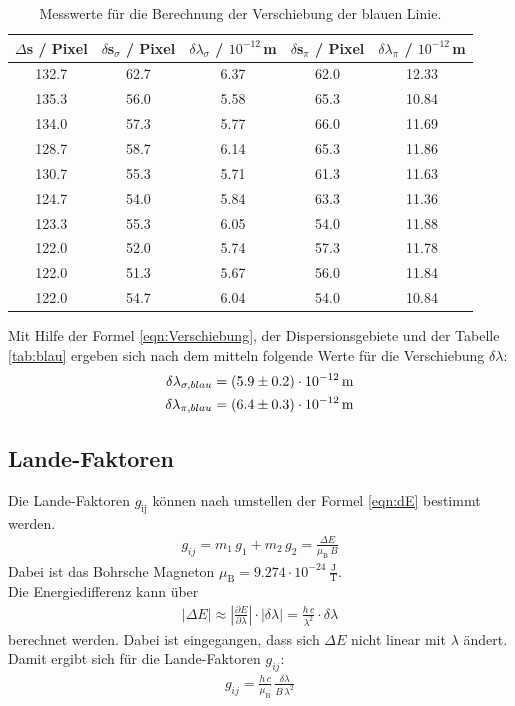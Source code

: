 \begin{table}[H]
  \centering
  \caption{Messwerte für die Berechnung der Verschiebung der blauen Linie.}
  \label{tab:blau}
  \begin{tabular}{c | c c | c c}
    $\Delta$s / Pixel & $\delta$s$_{\sigma}$ / Pixel & $\delta \lambda_{\sigma}$ / $10^{-12}$\,m & $\delta$s$_{\pi}$ / Pixel & $\delta \lambda_{\pi}$ / $10^{-12}$\,m \\
    \hline
    132.7 & 62.7 & 6.37 & 62.0 & 12.33 \\
    135.3 & 56.0 & 5.58 & 65.3 & 10.84 \\
    134.0 & 57.3 & 5.77 & 66.0 & 11.69 \\
    128.7 & 58.7 & 6.14 & 65.3 & 11.86 \\
    130.7 & 55.3 & 5.71 & 61.3 & 11.63 \\
    124.7 & 54.0 & 5.84 & 63.3 & 11.36 \\
    123.3 & 55.3 & 6.05 & 54.0 & 11.88 \\
    122.0 & 52.0 & 5.74 & 57.3 & 11.78 \\
    122.0 & 51.3 & 5.67 & 56.0 & 11.84 \\
    122.0 & 54.7 & 6.04 & 54.0 & 10.84 \\
    \hline
  \end{tabular}
\end{table}


Mit Hilfe der Formel \eqref{eqn:Verschiebung}, der Dispersionsgebiete und der Tabelle \eqref{tab:blau} ergeben sich nach dem mitteln folgende Werte für die Verschiebung $\delta\lambda$:
\begin{align*}
  \delta \lambda_{\sigma,blau} = (\num{5.9 +- 0.2})\cdot 10^{-12}\,\text{m} \\
  \delta \lambda_{\pi,blau} = (\num{6.4 +- 0.3})\cdot 10^{-12}\,\text{m}
\end{align*}



\subsection{Lande-Faktoren}
Die Lande-Faktoren $g_\text{ij}$ können nach umstellen der Formel \eqref{eqn:dE} bestimmt werden.
\begin{align}
  g_{ij} = m_1\,g_1 + m_2\,g_2 = \frac{\Delta E}{\mu_\text{B}\,B}
\end{align}
Dabei ist das Bohrsche Magneton $\mu_\text{B} = 9.274 \cdot 10^{-24}\,\frac{\text{J}}{\text{T}}$.\\
Die Energiedifferenz kann über
\begin{align}
  |\Delta E| \approx \left| \frac{\partial E}{\partial \lambda}\right| \cdot |\delta\lambda| = \frac{h\,c}{\lambda^2}\cdot \delta\lambda
\end{align}
berechnet werden. Dabei ist eingegangen, dass sich $\Delta E$ nicht linear mit $\lambda$ ändert. Damit ergibt sich für die Lande-Faktoren $g_{ij}$:
\begin{align}
  g_{ij} = \frac{h\,c}{\mu_\text{B}}\,\frac{\delta\lambda}{B\,\lambda^2}
  \label{eqn:Lande}
\end{align}


